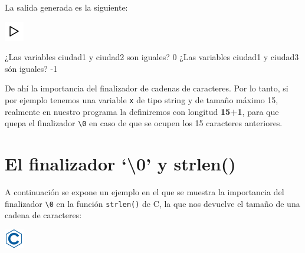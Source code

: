 \documentclass[
]{book}
\newenvironment{Shaded}{\begin{snugshade}}{\end{snugshade}}
\newcommand{\DecValTok}[1]{\textcolor[rgb]{0.00,0.00,0.81}{#1}}
\newcommand{\NormalTok}[1]{#1}
\begin{document}
La salida generada es la siguiente:

\includegraphics{./img/play.png}

\begin{Shaded}
\begin{Highlighting}[]
\NormalTok{¿Las variables ciudad1 y ciudad2 son iguales? }\DecValTok{0}
\NormalTok{¿Las variables ciudad1 y ciudad3 són iguales? {-}}\DecValTok{1}
\end{Highlighting}
\end{Shaded}

De ahí la importancia del finalizador de cadenas de caracteres. Por lo tanto, si por ejemplo tenemos una variable \texttt{x} de tipo string y de tamaño máximo 15, realmente en nuestro programa la definiremos con longitud \textbf{15+1}, para que quepa el finalizador \texttt{\textquotesingle{}\textbackslash{}0\textquotesingle{}} en caso de que se ocupen los 15 caracteres anteriores.

\hypertarget{el-finalizador-0-y-strlen}{%
\section{El finalizador `\textbackslash0' y strlen()}\label{el-finalizador-0-y-strlen}}

A continuación se expone un ejemplo en el que se muestra la importancia del finalizador \texttt{\textquotesingle{}\textbackslash{}0\textquotesingle{}} en la función \texttt{strlen()} de C, la que nos devuelve el tamaño de una cadena de caracteres:

\includegraphics{./img/c.png}
\end{document}
